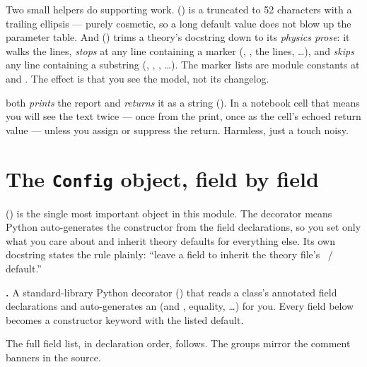 Two small helpers do supporting work. 
() is a  truncated to 52 characters
with a trailing ellipsis --- purely cosmetic, so a long default value does not
blow up the parameter table. And 
() trims a theory's docstring down to its
\emph{physics prose}: it walks the lines, \emph{stops} at any line containing a
 marker (, , the
 lines, \ldots), and \emph{skips} any line containing a
 substring (, ,
, \ldots). The marker lists are module constants at
 and . The effect is that you see the
model, not its changelog.

\begin{gotcha}
 both \emph{prints} the report and \emph{returns} it as a
string (). In a notebook cell that means you
will see the text twice --- once from the print, once as the cell's echoed return
value --- unless you assign or suppress the return. Harmless, just a touch noisy.
\end{gotcha}

\section{The \texttt{Config} object, field by field}

 () is the single most important
object in this module. The  decorator means Python
auto-generates the constructor from the field declarations, so you set only what
you care about and inherit theory defaults for everything else. Its own docstring
states the rule plainly: ``leave a field  to inherit the theory file's
~/~ default.''

\begin{defn}
\textbf{.} A standard-library Python decorator
() that reads a class's annotated field
declarations and auto-generates an  (and ,
equality, \ldots) for you. Every field below becomes a constructor keyword with
the listed default.
\end{defn}

The full field list, in declaration order, follows. The groups mirror the comment
banners in the source.

